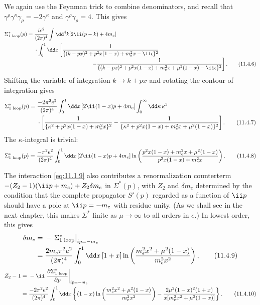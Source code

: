 We again use the Feynman trick to combine denominators, and recall that
$\gamma^\rho\gamma^\kappa\gamma_\rho=-2\gamma^\kappa$ and
$\gamma^\rho\gamma_\rho=4$. This gives
\begin{align}
\Sigma^*_{\text{1 loop}}(p)={}&\frac{ie^2}{(2\pi)^4}\int \dd^4k
[2\ii(\sl{p}-\sl{k})+4m_e]\notag\\
&\cdot\int_0^1\dd x\left[
\frac{1}{\{(k-px)^2+p^2x(1-x)+m_e^2x-\ii\epsilon\}^2}
\right.\notag\\[-2pt]
&\hspace{37mm}\left.
-\frac{1}{\{(k-px)^2+p^2x(1-x)+m_e^2x+\mu^2(1-x)-\ii\epsilon\}^2}
\right].
\tag{11.4.6}\label{eq:11.4.6}
\end{align}
Shifting the variable of integration $k\to k+px$ and rotating the contour of
integration gives
\begin{align}
\Sigma^*_{\text{1 loop}}(p)={}&\frac{-2\pi^2e^2}{(2\pi)^4}
\int_0^1\dd x\,[2\ii(1-x)\sl{p}+4m_e]\int_0^\infty \dd\kappa\,\kappa^3
\notag\\
&\cdot\left[
\frac{1}{\{\kappa^2+p^2x(1-x)+m_e^2x\}^2}
-\frac{1}{\{\kappa^2+p^2x(1-x)+m_e^2x+\mu^2(1-x)\}^2}
\right].
\tag{11.4.7}\label{eq:11.4.7}
\end{align}
The $\kappa$-integral is trivial:
\begin{equation}
\Sigma^*_{\text{1 loop}}(p)=\frac{-\pi^2e^2}{(2\pi)^4}
\int_0^1\dd x\,[2\ii(1-x)\sl{p}+4m_e]
\ln\left(\frac{p^2x(1-x)+m_e^2x+\mu^2(1-x)}
{p^2x(1-x)+m_e^2x}\right).
\tag{11.4.8}\label{eq:11.4.8}
\end{equation}

The interaction \eqref{eq:11.1.9} also contributes a renormalization counterterm
$-(Z_2-1)(\ii\sl{p}+m_e)+Z_2\delta m_e$ in $\Sigma^*(p)$, with $Z_2$ and
$\delta m_e$ determined by the condition that the complete propagator $S'(p)$
regarded as a function of $\ii\sl{p}$ should have a pole at
$\ii\sl{p}=-m_e$ with residue unity. (As we shall see in the next chapter,
this makes $\Sigma^*$ finite as $\mu\to\infty$ to all orders in $e$.) In
lowest order, this gives
\begin{align}
\delta m_e={}&-\left.\Sigma^*_{\text{1 loop}}\right|_{i\sl{p}=-m_e}
\notag\\
={}&\frac{2m_e\pi^2e^2}{(2\pi)^4}\int_0^1\dd x\,[1+x]
\ln\left(\frac{m_e^2x^2+\mu^2(1-x)}{m_e^2x^2}\right),
\tag{11.4.9}\label{eq:11.4.9}
\end{align}
\begin{align}
Z_2-1={}&-\ii\left.\frac{\partial\Sigma^*_{\text{1 loop}}}
{\partial\sl{p}}\right|_{i\sl{p}=-m_e}\notag\\
={}&\frac{-2\pi^2e^2}{(2\pi)^4}\int_0^1\dd x
\left\{(1-x)\ln\left(\frac{m_e^2x^2+\mu^2(1-x)}{m_e^2x^2}\right)
-\frac{2\mu^2(1-x)^2(1+x)}{x[m_e^2x^2+\mu^2(1-x)]}\right\}.
\tag{11.4.10}\label{eq:11.4.10}
\end{align}

